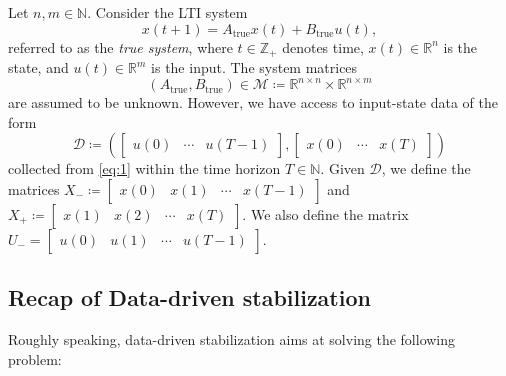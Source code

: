 \documentclass[9pt,shortpaper,twoside,web]{ieeecolor}
\begin{document}
Let $n,m\in\mathbb{N}$. Consider the LTI system
\begin{equation}
\label{eq:1}
x(t+1)=A_\text{true}x(t)+B_\text{true}u(t),
\end{equation}
referred to as the \emph{true system}, where $t\in\mathbb{Z}_+$ denotes time, \mbox{$x(t)\in\mathbb{R}^n$} is the state, and $u(t)\in\mathbb{R}^m$ is the input. The system matrices 
\begin{equation}
(A_\text{true},B_\text{true}) \in \mathcal{M} \coloneqq \mathbb{R}^{n \times n} \times \mathbb{R}^{n \times m}
\end{equation}
are assumed to be unknown. However, we have access to input-state data of the form
\begin{equation}
\label{eq:data}
\mathcal{D}\coloneqq\left(\begin{bmatrix}
    u(0)  & \cdots & u(T-1)
\end{bmatrix}, \begin{bmatrix}
    x(0) & \cdots & x(T)
\end{bmatrix}\right)
\end{equation} 
collected from \eqref{eq:1} within the time horizon $T\in\mathbb{N}$. Given $\mathcal{D}$, we define the matrices \mbox{$X_{-}\coloneqq \begin{bmatrix}
x(0) & x(1) & \cdots & x(T-1)
\end{bmatrix}$} and $X_{+}\coloneqq \begin{bmatrix}
x(1) & x(2) & \cdots & x(T)
\end{bmatrix}$. We also define the matrix \mbox{$U_- = \begin{bmatrix} u(0) & u(1) & \cdots & u(T-1) \end{bmatrix}$}. 

\subsection{Recap of Data-driven stabilization}

Roughly speaking, data-driven stabilization aims at solving the following problem:
\end{document}
